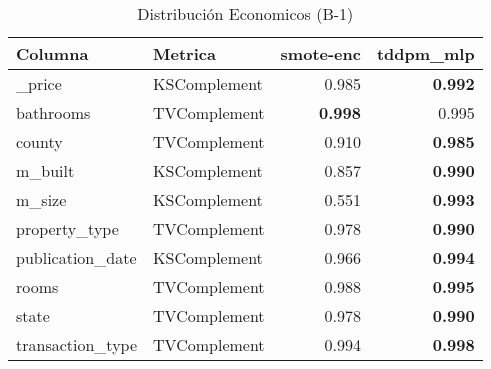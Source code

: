 \begin{table}[H]
\centering
\caption{Distribución Economicos (B-1)}
\label{table-shape-economicos-b-1}
\begin{tabular}{|l|l|r|r|}
\hline
\rowcolor[gray]{0.8}
Columna & Metrica & smote-enc & tddpm\_mlp \\
\hline \_price & KSComplement & 0.985 & \bfseries 0.992 \\
\hline bathrooms & TVComplement & \bfseries 0.998 & 0.995 \\
\hline county & TVComplement & 0.910 & \bfseries 0.985 \\
\hline m\_built & KSComplement & 0.857 & \bfseries 0.990 \\
\hline m\_size & KSComplement & 0.551 & \bfseries 0.993 \\
\hline property\_type & TVComplement & 0.978 & \bfseries 0.990 \\
\hline publication\_date & KSComplement & 0.966 & \bfseries 0.994 \\
\hline rooms & TVComplement & 0.988 & \bfseries 0.995 \\
\hline state & TVComplement & 0.978 & \bfseries 0.990 \\
\hline transaction\_type & TVComplement & 0.994 & \bfseries 0.998 \\
\hline
\end{tabular}
\end{table}
